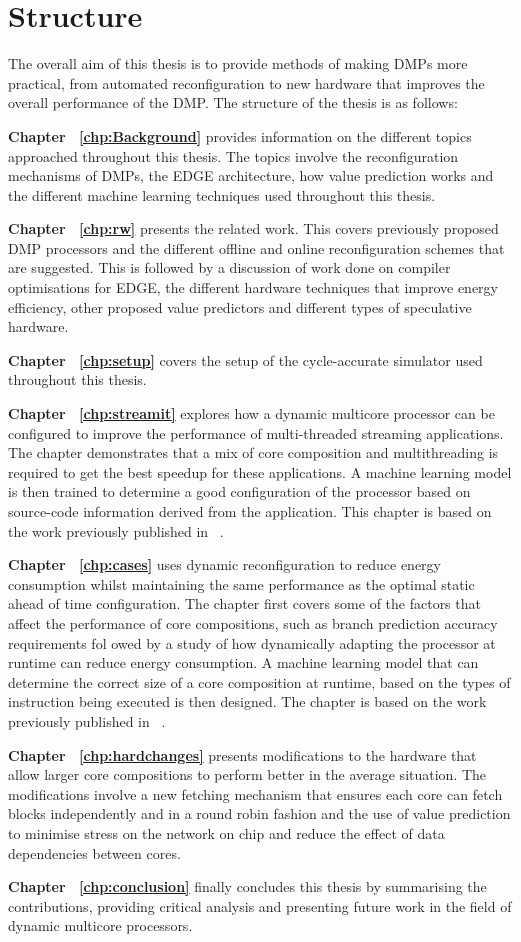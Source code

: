 \section{Structure}
The overall aim of this thesis is to provide methods of making DMPs more practical, from automated reconfiguration to new hardware that improves the overall performance of the DMP.
The structure of the thesis is as follows:

\textbf{Chapter ~\ref{chp:Background}} provides information on the different topics approached throughout this thesis. The topics involve the reconfiguration mechanisms of DMPs, the EDGE architecture, how value prediction works and the different machine learning techniques used throughout this thesis.

\textbf{Chapter ~\ref{chp:rw}} presents the related work. This covers previously proposed DMP processors and the different offline and online reconfiguration schemes that are suggested. 
This is followed by a discussion of work done on compiler optimisations for EDGE, the different hardware techniques that improve energy efficiency, other proposed value predictors and different types of speculative hardware.

\textbf{Chapter ~\ref{chp:setup}} covers the setup of the cycle-accurate simulator used throughout this thesis.

\textbf{Chapter ~\ref{chp:streamit}} explores how a dynamic multicore processor can be configured to improve the performance of multi-threaded streaming applications.
The chapter demonstrates that a mix of core composition and multithreading is required to get the best speedup for these applications.
A machine learning model is then trained to determine a good configuration of the processor based on source-code information derived from the application.
This chapter is based on the work previously published in ~\cite{micolet2016dmpstream}.

\textbf{Chapter ~\ref{chp:cases}} uses dynamic reconfiguration to reduce energy consumption whilst maintaining the same performance as the optimal static ahead of time configuration.
The chapter first covers some of the factors that affect the performance of core compositions, such as branch prediction accuracy requirements fol owed by a study of how dynamically adapting the processor at runtime can reduce energy consumption.
A machine learning model that can determine the correct size of a core composition at runtime, based on the types of instruction being executed is then designed.
The chapter is based on the work previously published in ~\cite{micolet2017cases}.

\textbf{Chapter ~\ref{chp:hardchanges}} presents modifications to the hardware that allow larger core compositions to perform better in the average situation.
The modifications involve a new fetching mechanism that ensures each core can fetch blocks independently and in a round robin fashion and the use of value prediction to minimise stress on the network on chip and reduce the effect of data dependencies between cores.

\textbf{Chapter ~\ref{chp:conclusion}} finally concludes this thesis by summarising the contributions, providing critical analysis and presenting future work in the field of dynamic multicore processors.